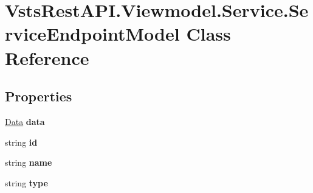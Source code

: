 \hypertarget{class_vsts_rest_a_p_i_1_1_viewmodel_1_1_service_1_1_service_endpoint_model}{}\section{Vsts\+Rest\+A\+P\+I.\+Viewmodel.\+Service.\+Service\+Endpoint\+Model Class Reference}
\label{class_vsts_rest_a_p_i_1_1_viewmodel_1_1_service_1_1_service_endpoint_model}
\subsection*{Properties}
\begin{DoxyCompactItemize}
\item 
\mbox{\label{class_vsts_rest_a_p_i_1_1_viewmodel_1_1_service_1_1_service_endpoint_model_adcc13fd199d022549df787a3762ceacc}} 
\mbox{\hyperlink{class_vsts_rest_a_p_i_1_1_viewmodel_1_1_service_1_1_data}{Data}} {\bfseries data}
\item 
\mbox{\label{class_vsts_rest_a_p_i_1_1_viewmodel_1_1_service_1_1_service_endpoint_model_ab99fecf2317bedbee35d4521ee2a4d83}} 
string {\bfseries id}
\item 
\mbox{\label{class_vsts_rest_a_p_i_1_1_viewmodel_1_1_service_1_1_service_endpoint_model_aa78143d876fead2e4f6d6cf3121e0518}} 
string {\bfseries name}
\item 
\mbox{\label{class_vsts_rest_a_p_i_1_1_viewmodel_1_1_service_1_1_service_endpoint_model_a115f21d8fd99b78328276b945e4f9ef2}} 
string {\bfseries type}
\item 
\mbox{\label{class_vsts_rest_a_p_i_1_1_viewmodel_1_1_service_1_1_service_endpoint_model_a13c9534e11114bef9d7fa6ebda8cbad4}} 

\end{DoxyCompactItemize}
